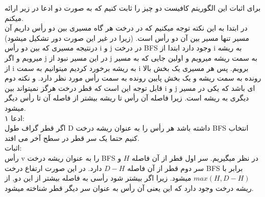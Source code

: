\problem{}
برای اثبات این الگوریتم کافیست دو چیز را ثابت کنیم که به صورت دو ادعا
در زیر ارائه میکنم.\\

در ابتدا به این نکته توجه میکنیم که در درخت هر گاه مسیری بین دو رأس داریم
آن مسیر تنها مسیر بین آن دو رأس است.
(زیرا در غیر این صورت دور تشکیل میشود)
درنتیجه مسیری که بین دو رأس i و j  در درخت BFS
وجود دارد ابتدا از i به ریشه میرویم
و اگر j در این مسیر نبود
از j به سمت ریشه میرویم و اولین جایی که به مسیر از i به ریشه برخورد کردیم
میتوانیم به سمت i برویم.
پس هر مسیری یک بخش بالا رونده به سمت ریشه و یک بخش پایین رونده به سمت
رأس مورد نظر دارد.
و نکته دوم قابل توجه این است که قطر درخت هرگز نمیتواند بین i و j ای باشد
که یکی در مسیر دیگری به ریشه است. زیرا فاصله آن رأس تا ریشه بیشتر از فاصله
آن تا رأس دیگر میشود.\\



ادعا ۱:\\
اگر قطر گراف طول D داشته باشد
هر رأس را به عنوان ریشه درخت BFS انتخاب کنیم
حتما یک سر قطر در سطح آخر می افتد.\\
اثبات:\\
رأس v را به عنوان ریشه درخت BFS در نظر میگیریم.
سر اول قطر از آن فاصله $H$ و سر دوم قطر از آن فاصله
$D - H$ دارد.
در این صورت ارتفاع درخت BFS برابر با $max(H,D-H)$ میشود.
زیرا اگر بیشتر شود رأسی به فاصله بیشتر از این دو, از ریشه درخت وجود دارد
که این یعنی آن رأس به عنوان سر دیگر قطر شناخته میشود.\\



